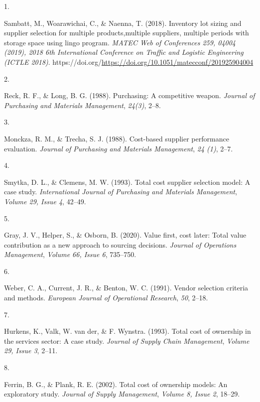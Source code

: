 \documentclass[preprint, 3p,
authoryear]{elsarticle} %
\newlength{\cslhangindent}
\newlength{\csllabelwidth}
\newlength{\cslentryspacingunit} %
\newenvironment{CSLReferences}[2] %
 {%
  \setlength{\parindent}{0pt}
  \ifodd #1
  \let\oldpar\par
  \def\par{\hangindent=\cslhangindent\oldpar}
  \fi
  \setlength{\parskip}{#2\cslentryspacingunit}
 }%
 {}
\newcommand{\CSLLeftMargin}[1]{\parbox[t]{\csllabelwidth}{#1}}
\newcommand{\CSLRightInline}[1]{\parbox[t]{\linewidth - \csllabelwidth}{#1}\break}
\begin{document}
\hypertarget{refs}{}
\begin{CSLReferences}{0}{0}
\leavevmode{}%
\CSLLeftMargin{1. }%
\CSLRightInline{Sambatt, M., Woarawichai, C., \& Naenna, T. (2018).
Inventory lot sizing and supplier selection for multiple
products,multiple suppliers, multiple periods with storage space using
lingo program. \emph{MATEC Web of Conferences 259, 04004 (2019), 2018
6th International Conference on Traffic and Logistic Engineering (ICTLE
2018)}.
https://doi.org/\url{https://doi.org/10.1051/matecconf/201925904004}}

\leavevmode{}%
\CSLLeftMargin{2. }%
\CSLRightInline{Reck, R. F., \& Long, B. G. (1988). Purchasing: A
competitive weapon. \emph{Journal of Purchasing and Materials
Management}, \emph{24(3)}, 2--8.}

\leavevmode{}%
\CSLLeftMargin{3. }%
\CSLRightInline{Monckza, R. M., \& Trecha, S. J. (1988). Cost-based
supplier performance evaluation. \emph{Journal of Purchasing and
Materials Management}, \emph{24 (1)}, 2--7.}

\leavevmode{}%
\CSLLeftMargin{4. }%
\CSLRightInline{Smytka, D. L., \& Clemens, M. W. (1993). Total cost
supplier selection model: A case study. \emph{International Journal of
Purchasing and Materials Management}, \emph{Volume 29, Issue 4},
42--49.}

\leavevmode{}%
\CSLLeftMargin{5. }%
\CSLRightInline{Gray, J. V., Helper, S., \& Osborn, B. (2020). Value
first, cost later: Total value contribution as a new approach to
sourcing decisions. \emph{Journal of Operations Management},
\emph{Volume 66, Issue 6}, 735--750.}

\leavevmode{}%
\CSLLeftMargin{6. }%
\CSLRightInline{Weber, C. A., Current, J. R., \& Benton, W. C. (1991).
Vendor selection criteria and methods. \emph{European Journal of
Operational Research}, \emph{50}, 2--18.}

\leavevmode{}%
\CSLLeftMargin{7. }%
\CSLRightInline{Hurkens, K., Valk, W. van der, \& F. Wynstra. (1993).
Total cost of ownership in the services sector: A case study.
\emph{Journal of Supply Chain Management}, \emph{Volume 29, Issue 3},
2--11.}

\leavevmode{}%
\CSLLeftMargin{8. }%
\CSLRightInline{Ferrin, B. G., \& Plank, R. E. (2002). Total cost of
ownership models: An exploratory study. \emph{Journal of Supply
Management}, \emph{Volume 8, Issue 2}, 18--29.}


\end{CSLReferences}
\end{document}
